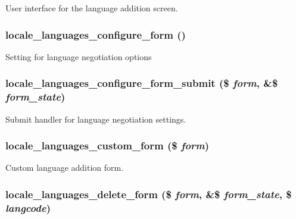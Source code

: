 \label{group__locale_ga717959709d412fc1039f7436501dbf49}
User interface for the language addition screen. \hypertarget{group__locale_gad4a0fb5717a5318793af57ec86169949}{
\subsubsection[{locale\_\-languages\_\-configure\_\-form}]{\setlength{\rightskip}{0pt plus 5cm}locale\_\-languages\_\-configure\_\-form ()}}
\label{group__locale_gad4a0fb5717a5318793af57ec86169949}
Setting for language negotiation options \hypertarget{group__locale_gad11520d8b7d086b4b801b4a51068ed11}{
\subsubsection[{locale\_\-languages\_\-configure\_\-form\_\-submit}]{\setlength{\rightskip}{0pt plus 5cm}locale\_\-languages\_\-configure\_\-form\_\-submit (\$ {\em form}, \/  \&\$ {\em form\_\-state})}}
\label{group__locale_gad11520d8b7d086b4b801b4a51068ed11}
Submit handler for language negotiation settings. \hypertarget{group__locale_ga38e919c4e98aba3e12136c2ac35b92f3}{
\subsubsection[{locale\_\-languages\_\-custom\_\-form}]{\setlength{\rightskip}{0pt plus 5cm}locale\_\-languages\_\-custom\_\-form (\$ {\em form})}}
\label{group__locale_ga38e919c4e98aba3e12136c2ac35b92f3}
Custom language addition form. \hypertarget{group__locale_gae91146ea73b4fde0a5584e4a9e502903}{
\subsubsection[{locale\_\-languages\_\-delete\_\-form}]{\setlength{\rightskip}{0pt plus 5cm}locale\_\-languages\_\-delete\_\-form (\$ {\em form}, \/  \&\$ {\em form\_\-state}, \/  \$ {\em langcode})}}
